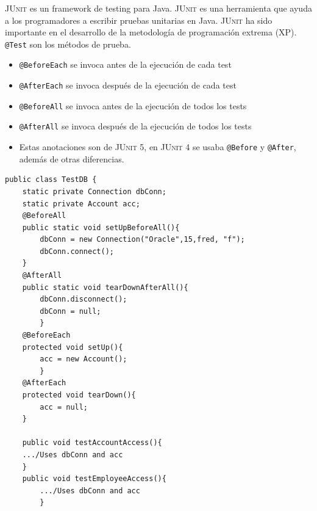 \begin{paracol}{2}
	
	\colfill
	\textsc{JUnit} es un framework de testing para Java. \textsc{JUnit} es una herramienta que ayuda a los programadores a escribir pruebas unitarias en Java. \textsc{JUnit} ha sido importante en el desarrollo de la metodología de programación extrema (XP).
	\lstinline|@Test| son los métodos de prueba.
	\begin{itemize}
		\item \lstinline|@BeforeEach| se invoca antes de la ejecución de cada test
		\item \lstinline|@AfterEach| se invoca después de la ejecución de cada test
		\item \lstinline|@BeforeAll| se invoca antes de la ejecución de todos los tests
		\item \lstinline|@AfterAll| se invoca después de la ejecución de todos los tests
		\item[] Estas anotaciones son de \textsc{JUnit 5}, en \textsc{JUnit 4} se usaba \lstinline|@Before| y \lstinline|@After|, además de otras diferencias.
	\end{itemize}
	
	\colfill
	\switchcolumn

	\begin{lstlisting}
public class TestDB {
	static private Connection dbConn;
	static private Account acc;
	@BeforeAll
	public static void setUpBeforeAll(){
		dbConn = new Connection("Oracle",15,fred, "f");
		dbConn.connect();
	}
	@AfterAll
	public static void tearDownAfterAll(){
		dbConn.disconnect();
		dbConn = null;
		}
	@BeforeEach
	protected void setUp(){
		acc = new Account();
		}
	@AfterEach
	protected void tearDown(){
		acc = null;
	}
	
	public void testAccountAccess(){
	.../Uses dbConn and acc
	}
	public void testEmployeeAccess(){
		.../Uses dbConn and acc
		}
\end{lstlisting}			
\end{paracol}

